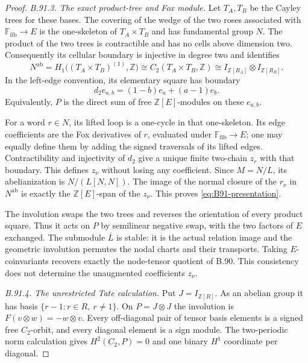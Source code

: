 \begin{proof}
\emph{B.91.3. The exact product-tree and Fox module.}
Let $T_A,T_B$ be the Cayley trees for these bases. The covering of
the wedge of the two roses associated with
$\mathbb F_{\mathrm{fib}}\to E$ is the one-skeleton of
$T_A\times T_B$ and has fundamental group $N$. The product of the
two trees is contractible and has no cells above dimension two.
Consequently its cellular boundary is injective in degree two and
identifies
\[
 N^{\mathrm{ab}}
   =H_1\bigl((T_A\times T_B)^{(1)},\mathbb Z\bigr)
   \cong C_2(T_A\times T_B,\mathbb Z)
   \cong I_{\mathbb Z[R_A]}\otimes I_{\mathbb Z[R_B]}.
\]
In the left-edge convention, its elementary square has boundary
\begin{equation}\label{eq:B91-square-boundary}
 d_2 e_{a,b}=(1-b)e_a+(a-1)e_b.
\end{equation}
Equivalently, $P$ is the direct sum of free $\mathbb Z[E]$-modules
on these $e_{a,b}$.

For a word $r\in N$, its lifted loop is a one-cycle in that
one-skeleton. Its edge coefficients are the Fox derivatives of
$r$, evaluated under $\mathbb F_{\mathrm{fib}}\to E$; one may
equally define them by adding the signed traversals of its lifted
edges. Contractibility and injectivity of $d_2$ give a unique
finite two-chain $z_r$ with that boundary. This defines $z_\nu$
without losing any coefficient. Since
$M=N/L$, its abelianization is
$N/(L[N,N])$. The image of the normal closure of the $r_\nu$
in $N^{\mathrm{ab}}$ is exactly the $\mathbb Z[E]$-span of the
$z_\nu$. This proves \eqref{eq:B91-presentation}.

The involution swaps the two trees and reverses the orientation
of every product square. Thus it acts on $P$ by semilinear negative
swap, with the two factors of $E$ exchanged. The submodule
$\overline L$ is stable: it is the actual relation image and the
geometric involution permutes the nodal charts and their transports.
Taking $E$-coinvariants recovers exactly the node-tensor quotient
of B.90. This consistency does not determine the unaugmented
coefficients $z_\nu$.

\emph{B.91.4. The unrestricted Tate calculation.}
Put $J=I_{\mathbb Z[R]}$. As an abelian group it has basis
$\{r-1:r\in R,\ r\ne1\}$. On $P=J\otimes J$ the involution is
$F(v\otimes w)=-w\otimes v$. Every off-diagonal pair of tensor
basis elements is a signed free $C_2$-orbit, and every diagonal
element is a sign module. The two-periodic norm calculation gives
$H^2(C_2,P)=0$ and one binary $H^1$ coordinate per diagonal.


\end{proof}
